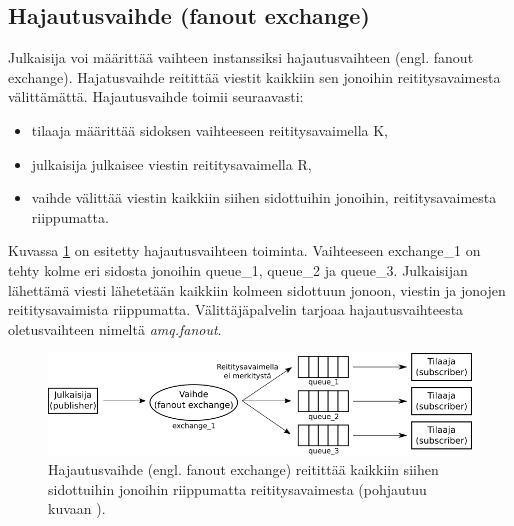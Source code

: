 \subsection{Hajautusvaihde (fanout exchange)}
Julkaisija voi määrittää vaihteen instanssiksi hajautusvaihteen (engl. fanout exchange). Hajatusvaihde reitittää viestit kaikkiin sen jonoihin reititysavaimesta välittämättä. Hajautusvaihde toimii seuraavasti:
\begin{itemize}
	\item tilaaja määrittää sidoksen vaihteeseen reititysavaimella K,
	\item julkaisija julkaisee viestin reititysavaimella R,
	\item vaihde välittää viestin kaikkiin siihen sidottuihin jonoihin, reititysavaimesta riippumatta.
\end{itemize}
Kuvassa \ref{fig:amqp-fanout-exchange} on esitetty hajautusvaihteen toiminta. Vaihteeseen exchange\_1 on tehty kolme eri sidosta jonoihin queue\_1, queue\_2 ja queue\_3. Julkaisijan lähettämä viesti lähetetään kaikkiin kolmeen sidottuun jonoon, viestin ja jonojen reititysavaimista riippumatta. Välittäjäpalvelin tarjoaa hajautusvaihteesta oletusvaihteen nimeltä \emph{amq.fanout}. \mbox{\cite[s.~27]{AMQP-specification}}

\begin{figure}[ht!]
	\includegraphics[width=1\textwidth]{pictures/amqp-fanout-exchange.png}
	\caption{Hajautusvaihde (engl. fanout exchange) reitittää kaikkiin siihen sidottuihin jonoihin riippumatta reititysavaimesta (pohjautuu kuvaan \mbox{\cite{RabbitMQ-AMQP-0-9-1-Model-Explained}}).}
	\label{fig:amqp-fanout-exchange}
\end{figure}


